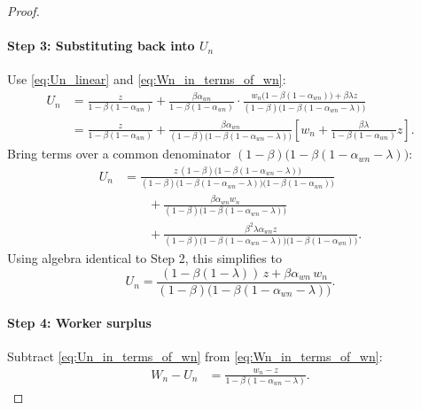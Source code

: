\documentclass[preprint,12pt]{elsarticle}
\begin{document}
\begin{proof}
\paragraph{Step 3: Substituting back into \(U_n\)}
Use \eqref{eq:Un_linear} and \eqref{eq:Wn_in_terms_of_wn}:
\begin{align}
U_n
&= \frac{z}{1-\beta(1-\alpha_{wn})}
+ \frac{\beta\alpha_{wn}}{1-\beta(1-\alpha_{wn})}
\cdot
\frac{w_n\big(1-\beta(1-\alpha_{wn})\big) + \beta\lambda z}
{(1-\beta)\big(1-\beta(1-\alpha_{wn}-\lambda)\big)}\\
&= \frac{z}{1-\beta(1-\alpha_{wn})}
+ \frac{\beta\alpha_{wn}}{(1-\beta)\big(1-\beta(1-\alpha_{wn}-\lambda)\big)}
\left[w_n + \frac{\beta\lambda}{1-\beta(1-\alpha_{wn})}z\right].
\end{align}
Bring terms over a common denominator \((1-\beta)\big(1-\beta(1-\alpha_{wn}-\lambda)\big)\):
\begin{align}
U_n
&= \frac{z\,(1-\beta)\big(1-\beta(1-\alpha_{wn}-\lambda)\big)}{(1-\beta)\big(1-\beta(1-\alpha_{wn}-\lambda)\big)\big(1-\beta(1-\alpha_{wn})\big)}\\
&\qquad 
+ \frac{\beta\alpha_{wn} w_n}{(1-\beta)\big(1-\beta(1-\alpha_{wn}-\lambda)\big)}\\
&\qquad
+ \frac{\beta^2\lambda\alpha_{wn} z}{(1-\beta)\big(1-\beta(1-\alpha_{wn}-\lambda)\big)\big(1-\beta(1-\alpha_{wn})\big)}.
\end{align}
Using algebra identical to Step 2, this simplifies to
\begin{equation}
U_n = \frac{(1-\beta(1-\lambda))\,z + \beta\alpha_{wn}\,w_n}
{(1-\beta)\big(1-\beta(1-\alpha_{wn}-\lambda)\big)}.
\label{eq:Un_in_terms_of_wn}
\end{equation}

\paragraph{Step 4: Worker surplus}
Subtract \eqref{eq:Un_in_terms_of_wn} from \eqref{eq:Wn_in_terms_of_wn}:
\begin{align}
W_n-U_n
&= \frac{w_n - z}{1-\beta(1-\alpha_{wn}-\lambda)}.
\end{align}


\end{proof}
\end{document}
